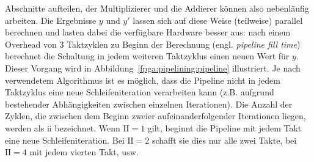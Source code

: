 Abschnitte aufteilen, der Multiplizierer und die Addierer können also
nebenläufig arbeiten. Die Ergebnisse $y$ und $y'$ lassen sich auf diese Weise
(teilweise) parallel berechnen und lasten dabei die verfügbare Hardware besser
aus: nach einem Overhead von 3 Taktzyklen zu Beginn der Berechnung (engl.
\textit{pipeline fill time}) berechnet die Schaltung in jedem weiteren
Taktzyklus einen neuen Wert für $y$. Dieser Vorgang wird in
Abbildung~\ref{fpga:pipelining:pipeline} illustriert. Je nach verwendetem
Algorithmus ist es möglich, dass die Pipeline nicht in jedem Taktzyklus eine
neue Schleifeniteration verarbeiten kann (z.B. aufgrund bestehender
Abhängigkeiten zwischen einzelnen Iterationen). Die Anzahl der Zyklen, die
zwischen dem Beginn zweier aufeinanderfolgender Iterationen liegen, werden als
\gls{ii} bezeichnet. Wenn $\text{II} = 1$ gilt, beginnt die Pipeline mit
jedem Takt eine neue Schleifeniteration. Bei $\text{II} = 2$ schafft sie dies
nur alle zwei Takte, bei $\text{II} = 4$ mit jedem vierten Takt, usw.
\cite[vgl.][20--21]{hlsintro2019}

